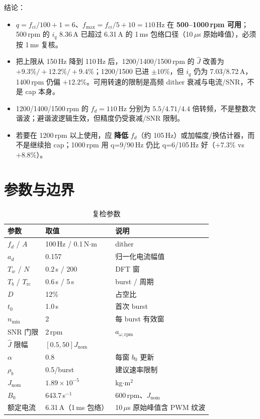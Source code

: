 \documentclass[11pt,a4paper]{article}
\newcommand{\Jnom}{J_{\mathrm{nom}}}
\newcommand{\Jhat}{\hat J}
\newcommand{\bzero}{b_0}
\newcommand{\rpm}{\mathrm{rpm}}
\begin{document}
结论：
\begin{itemize}
  \item \(q=f_{ci}/100+1=6\)、\(f_{\max}=f_{ci}/5+10=110\)\,Hz 在 \textbf{500--1000\,rpm 可用}；500\,rpm 的 \(i_q\) 8.36\,A 已超过 6.31\,A 的 1\,ms 包络口径（10\,$\mu$s 原始峰值），必须按 1\,ms 复核。
  \item 把上限从 150\,Hz 降到 110\,Hz 后，1200/1400/1500\,rpm 的 \(\Jhat\) 改善为 $+9.3\%/+12.2\%/+9.4\%$；1200/1500 已进 $\pm10\%$，但 \(i_q\) 仍为 7.03/8.72\,A，1400\,rpm 仍偏 $+12.2\%$。可用转速的限制是高频 dither 衰减与电流/SNR，不是 cap 本身。
  \item 1200/1400/1500\,rpm 的 \(f_d=110\)\,Hz 分别为 $5.5/4.71/4.4$ 倍转频，不是整数次谐波；避谐波逻辑生效，但精度仍受衰减/SNR 限制。
  \item 若要在 1200\,rpm 以上使用，应 \textbf{降低} \(f_d\)（约 105\,Hz）或加幅度/换估计器，而不是继续抬 cap；1000\,rpm 用 q=9/90\,Hz 仍比 q=6/105\,Hz 好（$+7.3\%$ vs $+8.8\%$）。
\end{itemize}

\section{参数与边界}

\begin{table}[H]
\centering\footnotesize
\caption{复检参数}\label{tab:par}
\begin{tabular}{@{}lll@{}}
\toprule
参数 & 取值 & 说明\\
\midrule
$f_d$ / $A$ & 100\,Hz / 0.1\,N$\cdot$m & dither\\
$a_d$ & 0.157 & 归一化电流幅值\\
$T_w$ / $N$ & 0.2\,s / 200 & DFT 窗\\
$T_b$ / $T_{\mathrm{rc}}$ & 0.6\,s / 5\,s & burst / 周期\\
$D$ & 12\% & 占空比\\
$t_0$ & 1.0\,s & 首次 burst\\
$n_{\min}$ & 2 & 每 burst 有效窗\\
SNR 门限 & 2\,rpm & $a_{\omega,\rpm}$\\
$\Jhat$ 限幅 & $[0.5,50]\Jnom$ & \\
$\alpha$ & 0.8 & 每窗 $\bzero$ 更新\\
$\rho_b$ & 0.5/burst & 建议速率限制\\
$\Jnom$ & $1.89\times10^{-5}$ & kg$\cdot$m$^2$\\
$B_0$ & 643.7\,s$^{-1}$ & 600\,rpm、$\Jnom$\\
额定电流 & 6.31\,A（1\,ms 包络） & 10\,$\mu$s 原始峰值含 PWM 纹波\\
\bottomrule
\end{tabular}
\end{table}
\end{document}
